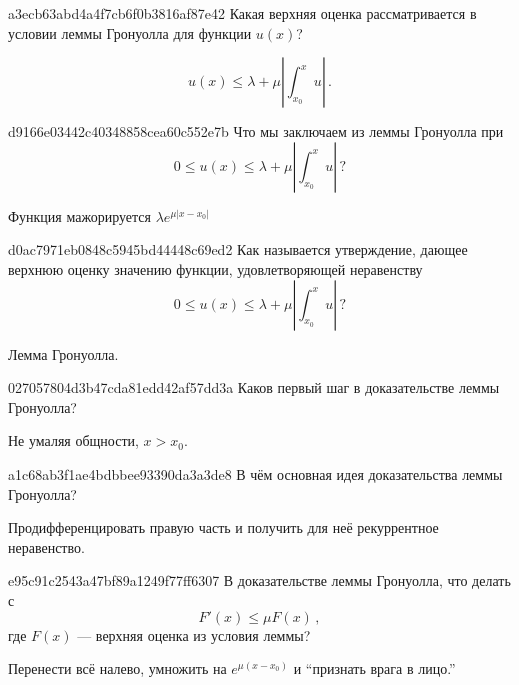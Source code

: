 \begin{note}{a3ecb63abd4a4f7cb6f0b3816af87e42}
    Какая верхняя оценка рассматривается в условии леммы Гронуолла для функции \({ u(x) }\)?

    \begin{cloze}{1}
        \[
            u(x) \leqslant \lambda + \mu \left\lvert \int_{x_0}^{x} u \right\rvert\,.
        \]
    \end{cloze}
\end{note}

\begin{note}{d9166e03442c40348858cea60c552e7b}
    Что мы заключаем из леммы Гронуолла при
    \[
        0 \leqslant u(x) \leqslant \lambda + \mu \left\lvert \int_{x_0}^{x} u \right\rvert\,?
    \]

    \begin{cloze}{1}
        Функция мажорируется \({ \lambda e^{\mu\left\lvert x - x_0 \right\rvert} }\)
    \end{cloze}
\end{note}

\begin{note}{d0ac7971eb0848c5945bd44448c69ed2}
    Как называется утверждение, дающее верхнюю оценку значению функции, удовлетворяющей неравенству
    \[
        0 \leqslant u(x) \leqslant \lambda + \mu \left\lvert \int_{x_0}^{x} u \right\rvert\,?
    \]

    \begin{cloze}{1}
        Лемма Гронуолла.
    \end{cloze}
\end{note}

\begin{note}{027057804d3b47cda81edd42af57dd3a}
    Каков первый шаг в доказательстве леммы Гронуолла?

    \begin{cloze}{1}
        Не умаляя общности, \({ x > x_0 }\).
    \end{cloze}
\end{note}

\begin{note}{a1c68ab3f1ae4bdbbee93390da3a3de8}
    В чём основная идея доказательства леммы Гронуолла?

    \begin{cloze}{1}
        Продифференцировать правую часть и получить для неё рекуррентное неравенство.
    \end{cloze}
\end{note}

\begin{note}{e95c91c2543a47bf89a1249f77ff6307}
    В доказательстве леммы Гронуолла, что делать с
    \[
        F'(x) \leqslant \mu F(x)\,,
    \]
    где \({ F(x) }\) --- верхняя оценка из условия леммы?

    \begin{cloze}{1}
        Перенести всё налево, умножить на \({ e^{\mu(x - x_0)} }\) и ``признать врага в лицо.''
    \end{cloze}
\end{note}


